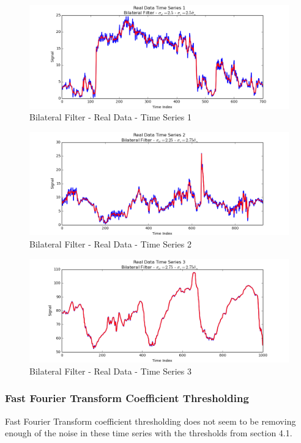 \documentclass[11pt]{article}
\theoremstyle{definition}
\begin{document}
\begin{figure}
\centering
\includegraphics[width = 0.75 \textwidth]{BilateralRealSignal1.png}
\caption{Bilateral Filter - Real Data - Time Series 1}
\label{bilateralrealsignal1}
\end{figure}

\begin{figure}
\centering
\includegraphics[width = 0.75 \textwidth]{BilateralRealSignal2.png}
\caption{Bilateral Filter - Real Data - Time Series 2}
\label{bilateralrealsignal2}
\end{figure}

\begin{figure}
\centering
\includegraphics[width = 0.75 \textwidth]{BilateralRealSignal3.png}
\caption{Bilateral Filter - Real Data - Time Series 3}
\label{bilateralrealsignal3}
\end{figure}

\newpage

\subsubsection{Fast Fourier Transform Coefficient Thresholding}

Fast Fourier Transform coefficient thresholding does not seem to be removing enough of the noise in these time series with the thresholds from section 4.1.
\end{document}
